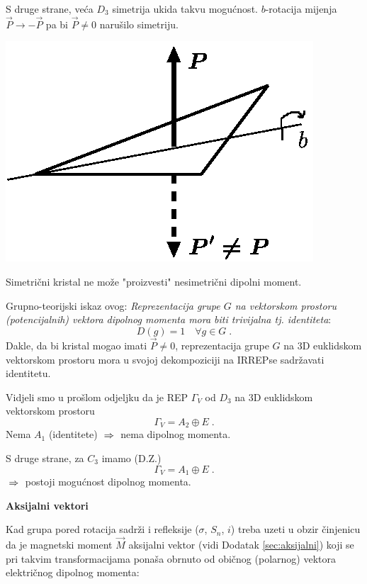 S druge strane, veća $D_3$ simetrija ukida takvu mogućnost. $b$-rotacija
mijenja $\vec{P}\to-\vec{P}$ pa bi $\vec{P}\neq 0$ narušilo simetriju.

\centerline{\includegraphics[scale=1.0]{pics/nodipol.eps}}

Simetrični kristal ne može "proizvesti" nesimetrični dipolni moment.

Grupno-teorijski iskaz ovog: \emph{Reprezentacija grupe $G$ na vektorskom
prostoru (potencijalnih) vektora dipolnog momenta mora biti trivijalna tj.
identiteta}:
\begin{displaymath}
   D(g)=1 \quad \forall g\in G \;.
\end{displaymath}
Dakle, da bi kristal mogao imati $\vec{P}\neq 0$, reprezentacija grupe $G$ na 
3D euklidskom vektorskom prostoru mora 
u svojoj dekompoziciji na IRREPse sadržavati identitetu.

Vidjeli smo u prošlom odjeljku da je REP $\Gamma_V$ od $D_3$ na 3D
euklidskom vektorskom prostoru
\begin{displaymath}
             \Gamma_V = A_2 \oplus E \;.
\end{displaymath}
Nema $A_1$ (identitete) $\;\Rightarrow\;$ nema dipolnog momenta.

S druge strane, za $C_3$ imamo (D.Z.)
\begin{displaymath}
             \Gamma_V = A_1 \oplus E \;.
\end{displaymath}
$\;\Rightarrow\;$ postoji mogućnost dipolnog momenta.

\textbf{Aksijalni vektori}

Kad grupa pored rotacija sadrži i refleksije ($\sigma$, $S_n$, $i$) treba
uzeti u obzir činjenicu da je magnetski moment $\vec{M}$ aksijalni
vektor (vidi Dodatak \ref{sec:aksijalni})
koji se pri takvim transformacijama ponaša obrnuto od običnog
(polarnog) vektora električnog dipolnog momenta:

